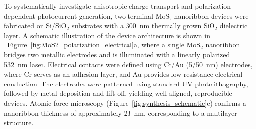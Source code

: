 \documentclass[journal=jacsnano,manuscript=article]{achemso}
\begin{document}

To systematically investigate anisotropic charge transport and polarization dependent photocurrent generation, two terminal MoS$_2$ nanoribbon devices were fabricated on Si/SiO$_2$ substrates with a 300~nm thermally grown SiO$_2$ dielectric layer. A schematic illustration of the device architecture is shown in ~Figure~\ref{fig:MoS2_polarization_electrical}a, where a single MoS$_2$ nanoribbon bridges two metallic electrodes and is illuminated with a linearly polarized 532~nm laser. Electrical contacts were defined using Cr/Au (5/50~nm) electrodes, where Cr serves as an adhesion layer, and Au provides low-resistance electrical conduction. The electrodes were patterned using standard UV photolithography, followed by metal deposition and lift off, yielding well aligned, reproducible devices. Atomic force microscopy (Figure~\ref{fig:synthesis_schematic}c) confirms a nanoribbon thickness of approximately 23~nm, corresponding to a multilayer structure.
\end{document}
